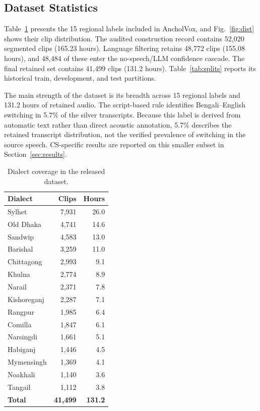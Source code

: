 \documentclass[journal]{IEEEtran}
\begin{document}
\subsection{Dataset Statistics}

Table~\ref{tab:dialects} presents the 15 regional labels included in AncholVox,
and Fig.~\ref{fig:dist} shows their clip distribution. The audited construction
record contains 52{,}020 segmented clips (165.23 hours). Language filtering
retains 48{,}772 clips (155.08 hours), and 48{,}484 of these enter the
no-speech/LLM confidence cascade. The final retained set contains 41{,}499 clips
(131.2 hours). Table~\ref{tab:splits} reports its historical train,
development, and test partitions.

The main strength of the dataset is its breadth across 15 regional labels and
131.2 hours of retained audio. The script-based rule identifies Bengali--English
switching in 5.7\% of the silver transcripts. Because this label is derived
from automatic text rather than direct acoustic annotation, 5.7\% describes
the retained transcript distribution, not the verified prevalence of switching
in the source speech. CS-specific results are reported on this smaller subset
in Section~\ref{sec:results}.


\begin{table}[t]
\caption{Dialect coverage in the released dataset.}
\label{tab:dialects}
\centering\small
\begin{tabular}{lrr}
\toprule
\textbf{Dialect} & \textbf{Clips} & \textbf{Hours} \\
\midrule
Sylhet & 7{,}931 & 26.0 \\
Old Dhaka & 4{,}741 & 14.6 \\
Sandwip & 4{,}583 & 13.0 \\
Barishal & 3{,}259 & 11.0 \\
Chittagong & 2{,}993 & 9.1 \\
Khulna & 2{,}774 & 8.9 \\
Narail & 2{,}371 & 7.8 \\
Kishoreganj & 2{,}287 & 7.1 \\
Rangpur & 1{,}985 & 6.4 \\
Comilla & 1{,}847 & 6.1 \\
Narsingdi & 1{,}661 & 5.1 \\
Habiganj & 1{,}446 & 4.5 \\
Mymensingh & 1{,}369 & 4.1 \\
Noakhali & 1{,}140 & 3.6 \\
Tangail & 1{,}112 & 3.8 \\
\midrule
\textbf{Total} & \textbf{41{,}499} & \textbf{131.2} \\
\bottomrule
\end{tabular}
\end{table}
\end{document}
